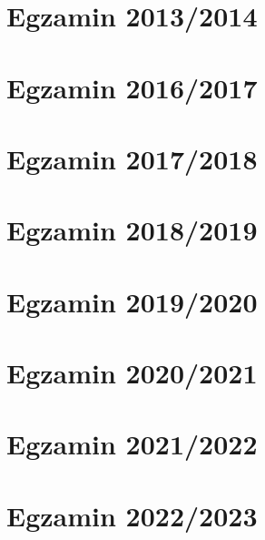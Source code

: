 \section{Egzamin 2013/2014}


\section{Egzamin 2016/2017}


\section{Egzamin 2017/2018}


\newpage
\section{Egzamin 2018/2019}


\newpage
\section{Egzamin 2019/2020}


\newpage
\section{Egzamin 2020/2021}


\newpage
\section{Egzamin 2021/2022}


\newpage
\section{Egzamin 2022/2023}

